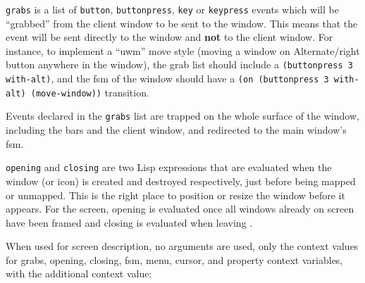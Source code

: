\centerline{}


\verb"grabs" is a list of \verb"button", \verb"buttonpress", \verb"key" or
\verb"keypress"  events which will be ``grabbed'' from the client window to
be sent to the {\GWM} window. This means that the event will be sent
directly to the {\GWM} window and {\bf not} to the client window.  For
instance, to implement a ``uwm'' move style (moving a window on
Alternate/right button anywhere in the window), the grab list should include
a \verb"(buttonpress 3 with-alt)", and the fsm of the window should have a
\verb"(on (buttonpress 3 with-alt) (move-window))" transition.

Events declared in the \verb"grabs" list are trapped on the whole surface of
the window, including the bars and the client window, and redirected to the
main window's fsm.

\verb"opening" and \verb"closing" are two Lisp expressions that are
evaluated when the window (or icon) is created and destroyed respectively,
just before being mapped or unmapped. This is the right place to position or
resize the window before it appears. For the screen, opening is evaluated
once all windows already on screen have been framed and closing is evaluated
when leaving {\GWM}.

When used for screen description, no arguments are used, only the context
values for grabs, opening, closing, fsm, menu, cursor, and property context
variables, with the additional context value:

